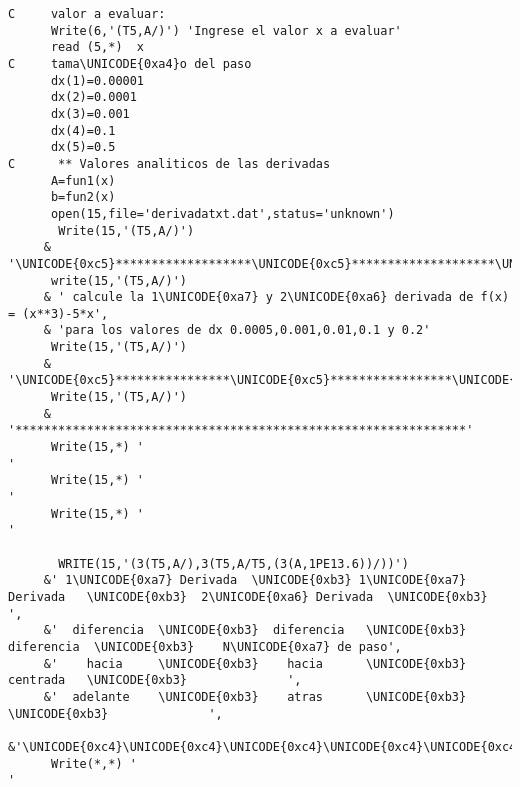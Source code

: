 \documentclass{article}
\begin{document}
\begin{verbatim}
C     valor a evaluar:
      Write(6,'(T5,A/)') 'Ingrese el valor x a evaluar'
      read (5,*)  x
C     tama\UNICODE{0xa4}o del paso
      dx(1)=0.00001
      dx(2)=0.0001
      dx(3)=0.001
      dx(4)=0.1
      dx(5)=0.5
C      ** Valores analiticos de las derivadas
      A=fun1(x)
      b=fun2(x)
      open(15,file='derivadatxt.dat',status='unknown')
       Write(15,'(T5,A/)')
     & '\UNICODE{0xc5}*******************\UNICODE{0xc5}********************\UNICODE{0xc5}********************\UNICODE{0xc5}'
      write(15,'(T5,A/)')
     & ' calcule la 1\UNICODE{0xa7} y 2\UNICODE{0xa6} derivada de f(x) = (x**3)-5*x',
     & 'para los valores de dx 0.0005,0.001,0.01,0.1 y 0.2'
      Write(15,'(T5,A/)')
     & '\UNICODE{0xc5}****************\UNICODE{0xc5}*****************\UNICODE{0xc5}**************************\UNICODE{0xc5}'
      Write(15,'(T5,A/)')
     & '***************************************************************'
      Write(15,*) '                                                    '
      Write(15,*) '                                                    '
      Write(15,*) '                                                   '
 
       WRITE(15,'(3(T5,A/),3(T5,A/T5,(3(A,1PE13.6))/))')
     &' 1\UNICODE{0xa7} Derivada  \UNICODE{0xb3} 1\UNICODE{0xa7} Derivada   \UNICODE{0xb3}  2\UNICODE{0xa6} Derivada  \UNICODE{0xb3}              ',
     &'  diferencia  \UNICODE{0xb3}  diferencia   \UNICODE{0xb3}   diferencia  \UNICODE{0xb3}    N\UNICODE{0xa7} de paso',
     &'    hacia     \UNICODE{0xb3}    hacia      \UNICODE{0xb3}    centrada   \UNICODE{0xb3}              ',
     &'  adelante    \UNICODE{0xb3}    atras      \UNICODE{0xb3}               \UNICODE{0xb3}              ',
     &'\UNICODE{0xc4}\UNICODE{0xc4}\UNICODE{0xc4}\UNICODE{0xc4}\UNICODE{0xc4}\UNICODE{0xc4}\UNICODE{0xc4}\UNICODE{0xc4}\UNICODE{0xc4}\UNICODE{0xc4}\UNICODE{0xc4}\UNICODE{0xc4}\UNICODE{0xc4}\UNICODE{0xc4}\UNICODE{0xc5}\UNICODE{0xc4}\UNICODE{0xc4}\UNICODE{0xc4}\UNICODE{0xc4}\UNICODE{0xc4}\UNICODE{0xc4}\UNICODE{0xc4}\UNICODE{0xc4}\UNICODE{0xc4}\UNICODE{0xc4}\UNICODE{0xc4}\UNICODE{0xc4}\UNICODE{0xc4}\UNICODE{0xc4}\UNICODE{0xc4}\UNICODE{0xc5}\UNICODE{0xc4}\UNICODE{0xc4}\UNICODE{0xc4}\UNICODE{0xc4}\UNICODE{0xc4}\UNICODE{0xc4}\UNICODE{0xc4}\UNICODE{0xc4}\UNICODE{0xc4}\UNICODE{0xc4}\UNICODE{0xc4}\UNICODE{0xc4}\UNICODE{0xc4}\UNICODE{0xc4}\UNICODE{0xc4}\UNICODE{0xc5}\UNICODE{0xc4}\UNICODE{0xc4}\UNICODE{0xc4}\UNICODE{0xc4}\UNICODE{0xc4}\UNICODE{0xc4}\UNICODE{0xc4}\UNICODE{0xc4}\UNICODE{0xc4}\UNICODE{0xc4}\UNICODE{0xc4}\UNICODE{0xc4}\UNICODE{0xc4}\UNICODE{0xc4}'
      Write(*,*) '                                                     '
 

\end{verbatim}
\end{document}
